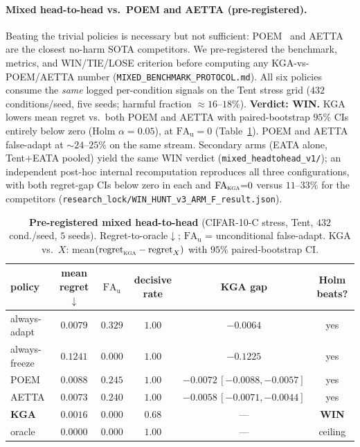 \documentclass[conference]{IEEEtran}
\theoremstyle{plain}
\theoremstyle{definition}
\begin{document}
\paragraph{Mixed head-to-head vs.\ POEM and AETTA (pre-registered).}
Beating the trivial policies is necessary but not sufficient: POEM~\cite{bar2024poem} and
AETTA~\cite{lee2024aetta} are the closest no-harm SOTA competitors. We pre-registered the
benchmark, metrics, and WIN/TIE/LOSE criterion before computing any KGA-vs-POEM/AETTA number
(\texttt{MIXED\_BENCHMARK\_PROTOCOL.md}). All six policies consume the \emph{same} logged
per-condition signals on the Tent stress grid ($432$ conditions/seed, five seeds; harmful
fraction ${\approx}16$--$18\%$). \textbf{Verdict: WIN.} \textsc{KGA} lowers mean regret vs.\
both POEM and AETTA with paired-bootstrap $95\%$ CIs entirely below zero (Holm $\alpha{=}0.05$),
at $\mathrm{FA}_{\mathrm u}{=}0$ (Table~\ref{tab:headtohead-poem-aetta}). POEM and AETTA
false-adapt at ${\sim}24$--$25\%$ on the same stream. Secondary arms (EATA alone, Tent+EATA
pooled) yield the same WIN verdict (\texttt{mixed\_headtohead\_v1/}); an independent
post-hoc internal recomputation reproduces all three configurations, with both regret-gap CIs below
zero in each and $\mathrm{FA}_{\textsc{kga}}{=}0$ versus $11$--$33\%$ for the competitors
(\texttt{research\_lock/WIN\_HUNT\_v3\_ARM\_F\_result.json}).

\begin{table}[t]\centering\small
\caption{\textbf{Pre-registered mixed head-to-head} (CIFAR-10-C stress, Tent, $432$ cond./seed,
$5$ seeds). Regret-to-oracle$\downarrow$; $\mathrm{FA}_{\mathrm u}$ = unconditional false-adapt.
KGA vs.\ $X$: mean$(\mathrm{regret}_{\textsc{kga}}-\mathrm{regret}_X)$ with $95\%$ paired-bootstrap CI.}
\label{tab:headtohead-poem-aetta}
{%
\begin{tabular}{lccccc}
\toprule
policy & mean regret$\downarrow$ & $\mathrm{FA}_{\mathrm u}$ & decisive rate & KGA gap & Holm beats? \\
\midrule
always-adapt  & $0.0079$ & $0.329$ & $1.00$ & $-0.0064$ & yes \\
always-freeze & $0.1241$ & $0.000$ & $1.00$ & $-0.1225$ & yes \\
POEM          & $0.0088$ & $0.245$ & $1.00$ & $-0.0072\,[-0.0088,-0.0057]$ & yes \\
AETTA         & $0.0073$ & $0.240$ & $1.00$ & $-0.0058\,[-0.0071,-0.0044]$ & yes \\
\textbf{\textsc{KGA}} & $\mathbf{0.0016}$ & $\mathbf{0.000}$ & $0.68$ & --- & \textbf{WIN} \\
oracle        & $0.0000$ & $0.000$ & $1.00$ & --- & ceiling \\
\bottomrule
\end{tabular}}
\end{table}
\end{document}
